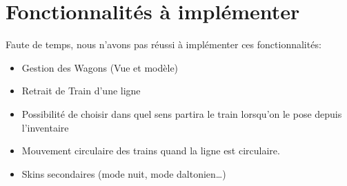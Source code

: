 \documentclass[report, backcover, french, nodocumentinfo]{upmethodology-document}
\begin{document}
	\section{Fonctionnalités à implémenter}
		\p{}
		Faute de temps, nous n'avons pas réussi à implémenter ces fonctionnalités:
		\begin{itemize}
			\item Gestion des Wagons (Vue et modèle)
			\item Retrait de Train d'une ligne
			\item Possibilité de choisir dans quel sens partira le train lorsqu'on le pose depuis l'inventaire
			\item Mouvement circulaire des trains quand la ligne est circulaire.
			\item Skins secondaires (mode nuit, mode daltonien\ldots)
		\end{itemize}
\end{document}
